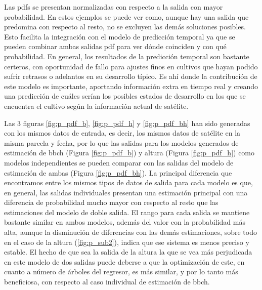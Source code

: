 \par Las \gls{pdf}s se presentan normalizadas con respecto a la salida con mayor probabilidad. En estos ejemplos se puede ver como, aunque hay una salida que predomina con respecto al resto, no se excluyen las demás soluciones posibles. Esto facilita la integración con el modelo de predicción temporal ya que se pueden combinar ambas salidas \gls{pdf} para ver dónde coinciden y con qué probabilidad. En general, los resultados de la predicción temporal son bastante certeros, con oportunidad de fallo para ajustes finos en cultivos que hayan podido sufrir retrasos o adelantos en su desarrollo típico. Es ahí donde la contribución de este modelo es importante, aportando información extra en tiempo real y creando una predicción de cuáles serían los posibles estados de desarrollo en los que se encuentra el cultivo según la información actual de satélite. 
\\
\par Las 3 figuras \ref{fig:p_pdf_b}, \ref{fig:p_pdf_h} y \ref{fig:p_pdf_bh} han sido generadas con los mismos datos de entrada, es decir, los mismos datos de satélite en la misma parcela y fecha, por lo que las salidas para los modelos generados de estimación de \gls{bbch} (Figura \ref{fig:p_pdf_b}) y altura (Figura \ref{fig:p_pdf_h}) como modelos independientes se pueden comparar con las salidas del modelo de estimación de ambas (Figura \ref{fig:p_pdf_bh}). La principal diferencia que encontramos entre los mismos tipos de datos de salida para cada modelo es que, en general, las salidas individuales presentan una estimación principal con una diferencia de probabilidad mucho mayor con respecto al resto que las estimaciones del modelo de doble salida. El rango para cada salida se mantiene bastante similar en ambos modelos, además del valor con la probabilidad más alta, aunque la disminución de diferencias con las demás estimaciones, sobre todo en el caso de la altura (\ref{fig:p_sub2}), indica que ese sistema es menos preciso y estable. El hecho de que sea la salida de la altura la que se vea más perjudicada en este modelo de dos salidas puede deberse a que la optimización de este, en cuanto a número de árboles del regresor, es más similar, y por lo tanto más beneficiosa, con respecto al caso individual de estimación de \gls{bbch}.

